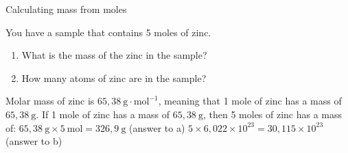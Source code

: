       \begin{wex}{Calculating mass from moles }{
      \label{m38717*id276928}You have a sample that contains 5 moles of zinc.
      \label{m38717*id276934}\begin{enumerate}[noitemsep, label=\textbf{\alph*}. ] 
            \label{m38717*uid12}\item What is the mass of the zinc in the sample?
\label{m38717*uid13}\item How many atoms of zinc are in the sample?
\end{enumerate}
}
{
      \label{m38717*id276984}Molar mass of zinc is $65,38 ~\text{g} \cdot \text{mol}^{-1}$, meaning that 1 mole of zinc has a mass of $65,38 ~\text{g}$.
      \label{m38717*id277021}If 1 mole of zinc has a mass of $65,38 ~\text{g}$, then 5 moles of zinc has a mass of: $65,38 ~\text{g} \times 5 ~\text{mol}=326,9 ~\text{g}$ (answer to a) 
$5 \times 6,022 \times {10}^{23} = 30,115 \times {10}^{23}$
      \label{m38717*id277263}(answer to b)
}
    \end{wex}
    \noindent 
\label{m38717*secfhsst!!!underscore!!!id305}
